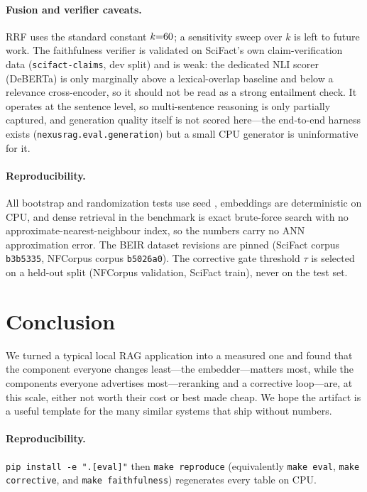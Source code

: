 \documentclass[11pt]{article}
\begin{document}
\paragraph{Fusion and verifier caveats.} RRF uses the standard constant
$k{=}60{}$; a sensitivity sweep over $k$ is left to future work. The
faithfulness verifier is validated on SciFact's own claim-verification data
(\texttt{scifact-claims}, dev split) and is weak: the dedicated NLI scorer
(DeBERTa) is only marginally above a lexical-overlap baseline and below a
relevance cross-encoder, so it should not be read as a strong entailment check.
It operates at the sentence level, so multi-sentence reasoning is only partially
captured, and generation quality itself is not scored here---the end-to-end
harness exists (\texttt{nexusrag.eval.generation}) but a small CPU generator is
uninformative for it.

\paragraph{Reproducibility.} All bootstrap and randomization tests use seed
\EvalSeed{}, embeddings are deterministic on CPU, and dense retrieval in the
benchmark is exact brute-force search with no approximate-nearest-neighbour
index, so the numbers carry no ANN approximation error. The BEIR dataset
revisions are pinned (SciFact corpus \texttt{b3b5335}, NFCorpus corpus
\texttt{b5026a0}). The corrective gate threshold $\tau$ is selected on a held-out
split (NFCorpus validation, SciFact train), never on the test set.

\section{Conclusion}

We turned a typical local RAG application into a measured one and found that the
component everyone changes least---the embedder---matters most, while the
components everyone advertises most---reranking and a corrective loop---are, at
this scale, either not worth their cost or best made cheap. We hope the artifact
is a useful template for the many similar systems that ship without numbers.

\paragraph{Reproducibility.} \texttt{pip install -e ".[eval]"} then
\texttt{make reproduce} (equivalently \texttt{make eval}, \texttt{make corrective},
and \texttt{make faithfulness}) regenerates every table on CPU.



\end{document}
